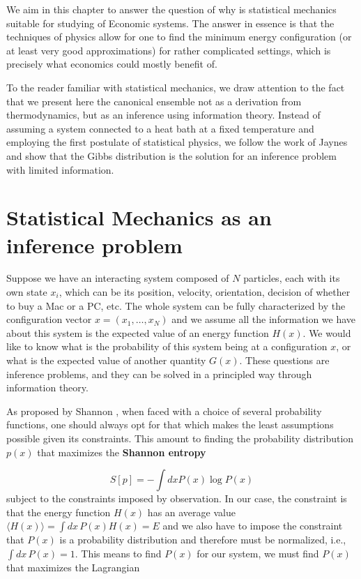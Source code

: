 We aim in this chapter to answer the question of why is statistical mechanics suitable for studying of Economic systems. The answer in essence is that the techniques of physics allow for one to find the minimum energy configuration (or at least very good approximations) for rather complicated settings, which is precisely what economics could mostly benefit of. 

To the reader familiar with statistical mechanics, we draw attention to the fact that we present here the canonical ensemble not as a derivation from thermodynamics, but as an inference using information theory. Instead of assuming a system connected to a heat bath at a fixed temperature and employing the first postulate of statistical physics, we follow the work of Jaynes \cite{Jaynes57} and show that the Gibbs distribution is the solution for an inference problem with limited information.

\section{Statistical Mechanics as an inference problem}

Suppose we have an interacting system composed of $N$ particles, each with its own state $x_i$, which can be its position, velocity, orientation, decision of whether to buy a Mac or a PC, etc. The whole system can be fully characterized by the configuration vector $x = (x_1, \ldots, x_N)$ and we assume all the information we have about this system is the expected value of an energy function $H(x)$. We would like to know what is the probability of this system being at a configuration $x$, or what is the expected value of another quantity $G(x)$. These questions are inference problems, and they can be solved in a principled way through information theory.

As proposed by Shannon \cite{shannon1948}, when faced with a choice of several probability functions, one should always opt for that which makes the least assumptions possible given its constraints. This amount to finding the probability distribution $p(x)$ that maximizes the \textbf{Shannon entropy}

\begin{equation}
    S[p] = - \int dx P(x) \log P(x)
\end{equation}
subject to the constraints imposed by observation. In our case, the constraint is that the energy function $H(x)$ has an average value $\langle H(x) \rangle = \int dx \, P(x) H(x) = E$ and we also have to impose the constraint that $P(x)$ is a probability distribution and therefore must be normalized, i.e., $\int dx \, P(x) = 1$. This means to find $P(x)$ for our system, we must find $P(x)$ that maximizes the Lagrangian

